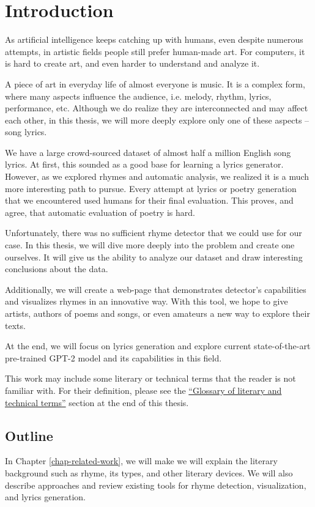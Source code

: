 \chapter*{Introduction}

As artificial intelligence keeps catching up with humans, even despite numerous attempts, in artistic fields people still prefer human-made art.
For computers, it is hard to create art, and even harder to understand and analyze it.

A piece of art in everyday life of almost everyone is music. It is a complex form, where many aspects influence the audience, i.e. melody, rhythm, lyrics, performance, etc. Although we do realize they are interconnected and may affect each other, in this thesis, we will more deeply explore only one of these aspects -- song lyrics. 

We have a large crowd-sourced dataset of almost half a million English song lyrics. At first, this sounded as a good base for learning a lyrics generator. However, as we explored rhymes and automatic analysis, we realized it is a much more interesting path to pursue. Every attempt at lyrics or poetry generation that we encountered used humans for their final evaluation. This proves, and \cite{greene2010automatic} agree, that automatic evaluation of poetry is hard.

Unfortunately, there was no sufficient rhyme detector that we could use for our case. In this thesis, we will dive more deeply into the problem and create one ourselves. It will give us the ability to analyze our dataset and draw interesting conclusions about the data. 

Additionally, we will create a web-page that demonstrates detector's capabilities and visualizes rhymes in an innovative way. With this tool, we hope to give artists, authors of poems and songs, or even amateurs a new way to explore their texts.

At the end, we will focus on lyrics generation and explore current state-of-the-art
pre-trained GPT-2 model and its capabilities in this field.

This work may include some literary or technical terms that the reader is not familiar with. For their definition, please see the \hyperref[glossary-section]{``Glossary of literary and technical terms''} section at the end of this thesis.


\section*{Outline}
In Chapter \ref{chap-related-work}, we will make we will explain the literary background such as rhyme, its types, and other literary devices. We will also describe approaches and review existing tools for rhyme detection, visualization, and lyrics generation. 

